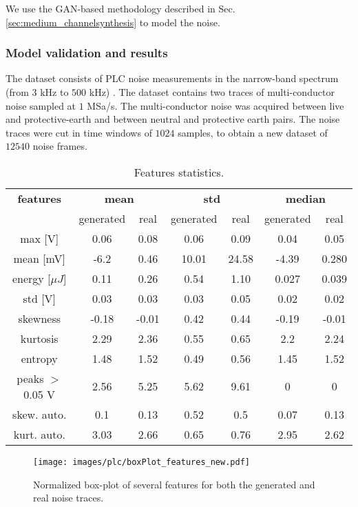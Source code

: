 We use the GAN-based methodology described in Sec. \ref{sec:medium_channelsynthesis} to model the noise.

\subsubsection{Model validation and results}
The dataset consists of PLC noise measurements in the narrow-band spectrum (from $3$ kHz to $500$ kHz) \cite{8360239}. The dataset contains two traces of multi-conductor
noise sampled at $1$ MSa/s. The multi-conductor noise was
acquired between live and protective-earth and between neutral
and protective earth pairs. The noise traces were cut in time
windows of $1024$ samples, to obtain a new dataset of $12540$
noise frames.

\begin{table}
	\scriptsize %
	\centering
	\caption{Features statistics.}
	\begin{tabular}{c|cc|cc|cc} 
		\toprule
		\textbf{features}  & \multicolumn{2}{c|}{\textbf{mean}} & \multicolumn{2}{c}{\textbf{std}} & \multicolumn{2}{|c}{\textbf{median}} \\
		& generated &	real&	generated&	real&	generated&	real \\
		\midrule
		max [V]& 0.06&	0.08&	0.06&	0.09&	0.04&	0.05 \\
		mean [mV]& -6.2&	0.46&	10.01&	24.58&	-4.39&	0.280\\
		energy [$\mu J$]& 0.11&	0.26&	0.54&	1.10&	0.027&	0.039\\
		std [V] & 0.03&	0.03&	0.03&	0.05&	0.02&	0.02\\
		skewness& -0.18&	-0.01&	0.42&	0.44&	-0.19&	-0.01\\
		kurtosis& 2.29&	2.36&	0.55&	0.65&	2.2&	2.24\\
		entropy& 1.48&	1.52&	0.49&	0.56&	1.45&	1.52\\
		peaks $>$ 0.05 V & 2.56&	5.25&	5.62&	9.61&	0&	0\\
		skew. auto.& 0.1&	0.13&	0.52&	0.5&	0.07&	0.13\\
		kurt. auto.& 3.03&	2.66&	0.65&	0.76&	2.95&	2.62\\		
	\end{tabular}
	\label{tab:plc_features_stat}
\end{table}

\begin{figure}
	\centering
	\texttt{[image: images/plc/boxPlot\_features\_new.pdf]}
	\caption{Normalized box-plot of several features for both the generated and real noise traces.}
	\label{fig:plc_Boxplot}
\end{figure}

